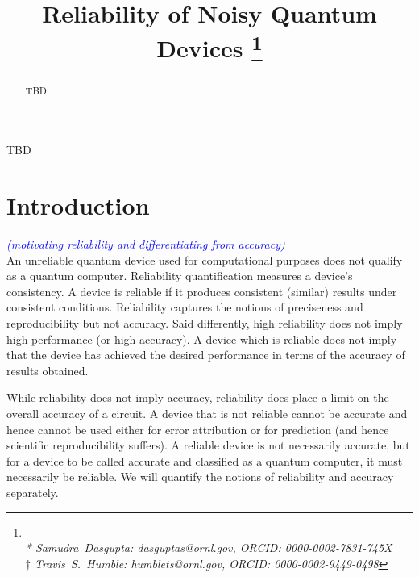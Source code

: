 \documentclass[conference]{IEEEtran}
\begin{document}
\title{Reliability of Noisy Quantum Devices
\thanks{\textit{\\ 
* Samudra~Dasgupta: dasguptas@ornl.gov, ORCID: 0000-0002-7831-745X \\
$\dagger$ Travis~S.~Humble: humblets@ornl.gov, ORCID: 0000-0002-9449-0498
}}}

\author{
}


\maketitle

\begin{abstract}
TBD
\end{abstract}

\begin{IEEEkeywords}
TBD
\end{IEEEkeywords}

\section{Introduction}
\textcolor{blue}{\textit{(motivating reliability and differentiating from accuracy)}}\\
An unreliable quantum device used for computational purposes does not qualify as a quantum computer. Reliability quantification measures a device's consistency. A device is reliable if it produces consistent (similar) results under consistent conditions. Reliability captures the notions of preciseness and reproducibility but not accuracy. Said differently, high reliability does not imply high performance (or high accuracy). A device which is reliable does not imply that the device has achieved the desired performance in terms of the accuracy of results obtained.
\par
While reliability does not imply accuracy, reliability does place a limit on the overall accuracy of a circuit. A device  that is not reliable cannot be accurate and hence cannot be used either for error attribution or for prediction (and hence scientific reproducibility suffers). A reliable device is not necessarily accurate, but for a device to be called accurate and classified as a quantum computer, it must necessarily be reliable. We will quantify the notions of reliability and accuracy separately.
\end{document}
